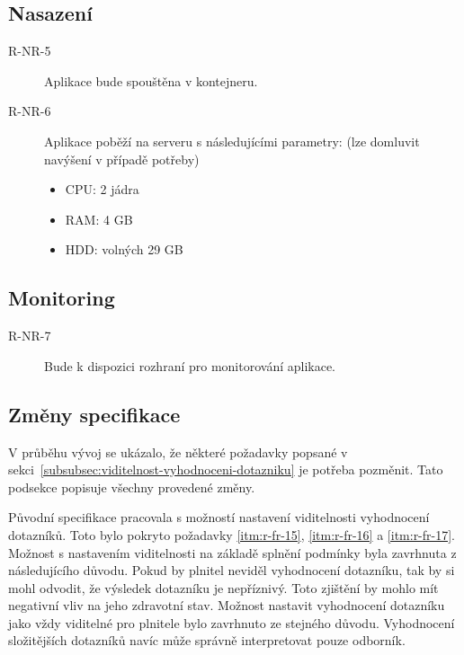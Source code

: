 \subsection{Nasazení}\label{subsec:deployment}

\begin{description}
    \item[R-NR-5]
    Aplikace bude spouštěna v kontejneru.
    \item[R-NR-6]
    Aplikace poběží na serveru s následujícími parametry: (lze domluvit navýšení v případě potřeby)

    \begin{itemize}
        \item
        CPU: 2 jádra
        \item
        RAM: 4 GB
        \item
        HDD: volných 29 GB
    \end{itemize}
\end{description}

\subsection{Monitoring}\label{subsec:monitoring}

\begin{description}
    \item[R-NR-7]
    Bude k dispozici rozhraní pro monitorování aplikace.
\end{description}

\subsection{Změny specifikace}\label{subsec:zmeny-specifikace}

V průběhu vývoj se ukázalo, že některé požadavky popsané v sekci~\ref{subsubsec:viditelnost-vyhodnoceni-dotazniku} je potřeba pozměnit.
Tato podsekce popisuje všechny provedené změny.

Původní specifikace pracovala s možností nastavení viditelnosti vyhodnocení dotazníků.
Toto bylo pokryto požadavky \ref{itm:r-fr-15}, \ref{itm:r-fr-16} a \ref{itm:r-fr-17}.
Možnost s nastavením viditelnosti na základě splnění podmínky byla zavrhnuta z následujícího důvodu.
Pokud by plnitel neviděl vyhodnocení dotazníku, tak by si mohl odvodit, že výsledek dotazníku je nepříznivý.
Toto zjištění by mohlo mít negativní vliv na jeho zdravotní stav.
Možnost nastavit vyhodnocení dotazníku jako vždy viditelné pro plnitele bylo zavrhnuto ze stejného důvodu.
Vyhodnocení složitějších dotazníků navíc může správně interpretovat pouze odborník.

